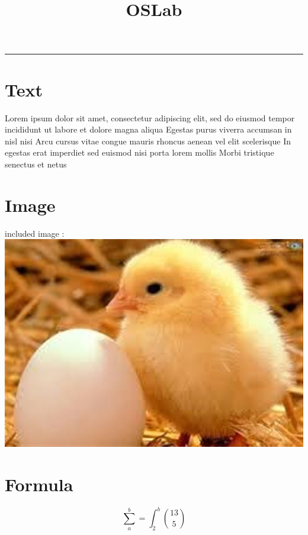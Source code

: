 \documentclass[12pt]{article}
\begin{document}
\title{OSLab}
\maketitle

\noindent
{\color{red} \rule{\linewidth}{0.5mm} }

\section{Text}
Lorem ipsum dolor sit amet, consectetur adipiscing elit, sed do eiusmod tempor incididunt ut labore et dolore magna aliqua Egestas purus viverra accumsan in nisl nisi Arcu cursus vitae congue mauris rhoncus aenean vel elit scelerisque In egestas erat imperdiet sed euismod nisi porta lorem mollis Morbi tristique senectus et netus \\

\section{Image}
\begin{center}
   included image : \\
    \includegraphics[scale=0.3]{1.jpg}
\end{center}

\newpage
\section{Formula}
\begin{center}
    {\Large
       $$ \sum_{a}^{b}= \int_{2}^{b} \binom{13}{5} $$
    } 
\end{center}
\end{document}
